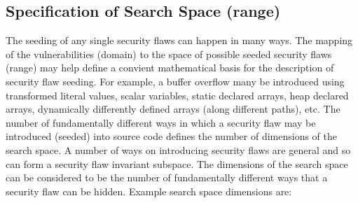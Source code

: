 \subsection{Specification of Search Space (range)}
         \label{sec:SpecificationOfSearchSpace}
         The seeding of any single security flaws can happen in many ways. The mapping of
         the vulnerabilities (domain) to the space of possible seeded security flaws
         (range) may help define a convient mathematical basis for the description of
         security flaw seeding.  For example, a buffer overflow many be introduced 
         using transformed literal values, scalar variables,
         static declared arrays, heap declared arrays, dynamically differently
         defined arrays (along different paths), etc.  The number of fundamentally
         different ways in which a security flaw may be introduced (seeded) into source
         code defines the number of dimensions of the search space.  A number of
         ways on introducing security flaws are general and so can form a 
         security flaw invariant subspace. The dimensions of the search space can be
         considered to be the number of fundamentally different ways that a security flaw
         can be hidden. Example search space dimensions are:
